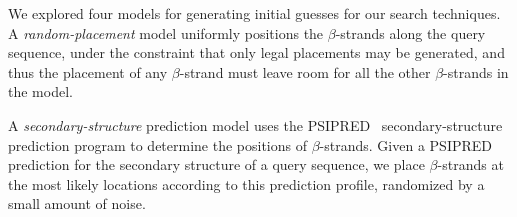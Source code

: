 \documentclass{acm_proc_article-sp}
\begin{document}





We explored four models for generating initial guesses for our search
techniques.
A \emph{random-placement} model uniformly positions 
the $\beta$-strands
along the query sequence, under the constraint that only legal placements
may be generated, and thus the placement of any $\beta$-strand must leave 
room for all the other $\beta$-strands in the model.

A \emph{secondary-structure} prediction model uses the 
PSIPRED~\cite{McGuffin:2000wx} 
secondary-structure
prediction program to determine the positions of $\beta$-strands.
Given a PSIPRED prediction for the secondary structure of a query sequence,
we place $\beta$-strands at the most likely locations according to this
prediction profile, randomized by a small amount of noise.
  
\end{document}
